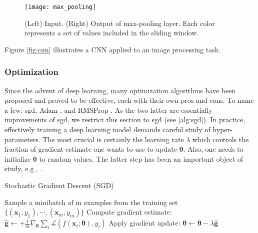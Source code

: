 \begin{figure}[!htpb]
  \texttt{[image: max\_pooling]}
  \caption{(Left) Input. (Right) Output of max-pooling layer. Each color represents a set of values included in the sliding window.}
  \label{fig:max_pool}
\end{figure}
Figure \ref{fig:cnn} illustrates a CNN applied to an image processing task.

\subsubsection{Optimization}
Since the advent of deep learning, many optimization algorithms have been proposed and proved to be effective, each with their own pros and cons.
To name a few: \gls{sgd}, Adam \cite{kingma14}, and RMSProp \cite{tieleman12}.
As the two latter are essentially improvements of \gls{sgd}, we restrict this section to \gls{sgd} (see \ref{alg:sgd}).
In practice, effectively training a deep learning model demands careful study of hyper-parameters.
The most crucial is certainly the learning rate $\lambda$ which controls the fraction of gradient-estimate one wants to use to update $\bm{\theta}$.
Also, one needs to initialize $\bm{\theta}$ to random values.
The latter step has been an important object of study, e.g \cite{he15}, \cite{glorot10}.

\begin{algorithm}[H]
  \label{alg:sgd}
 \caption{Stochastic Gradient Descent (SGD)}

 \begin{algorithmic}[1]
  \Repeat
    \State Sample a minibatch of m examples from the training set $\{(\bm{x}_{1},y_{1}), \cdots, (\bm{x}_{m},y_{m})\}$
    \State Compute gradient estimate: $\hat{\bm{g}} \leftarrow + \frac{1}{m} \nabla_{\bm{\theta}}\sum_{i}\mathcal{L}(f(\bm{x}_{i}; \bm{\theta}), y_{i})$
    \State Apply gradient update: $\bm{\theta} \leftarrow \bm{\theta} - \lambda \hat{\bm{g}}$
  \end{algorithmic}
\end{algorithm}


